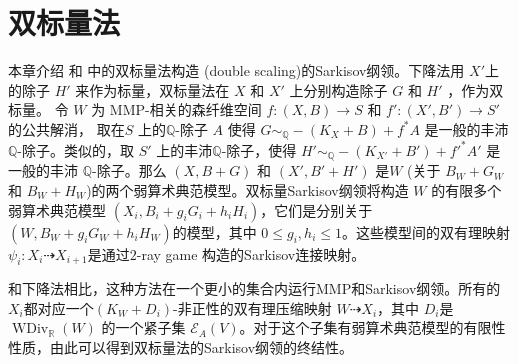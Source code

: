 \chapter{双标量法}
 本章介绍\cite[\S 13]{haconMinimalModelProgram2012} 和  \cite{liuSarkisovProgramGeneralized2021}中的双标量法构造 (double scaling)的Sarkisov纲领。下降法用 $X'$上的除子 $H'$ 来作为标量，双标量法在  $X$ 和 $X'$ 上分别构造除子 $G$ 和 $H'$ ，作为双标量。
令 $W$ 为 MMP-相关的森纤维空间 $f:(X,B)\to S$ 和 $f':(X',B')\to S'$  的公共解消，  取在$ S $ 上的$\mathbb{Q}$-除子 $A$ 使得 $G \sim_{\mathbb{Q}} -(K_{X}+B) +f^*A$ 是一般的丰沛 $\mathbb{Q}$-除子。类似的，取 $S'$ 上的丰沛$\mathbb{Q}$-除子，使得 $H' \sim_{\mathbb{Q}} -(K_{X'}+B') +f'^*A'$ 是一般的丰沛 $\mathbb{Q}$-除子。那么  $(X,B+G)$ 和 $(X',B'+H')$  是$W$ (关于 $B_{W}+G_{W}$ 和 $B_{W}+H_{W}$)的两个弱算术典范模型。双标量Sarkisov纲领将构造 $W$ 的有限多个弱算术典范模型 $(X_{i},B_{i}+g_{i}G_{i}+h_{i}H_{i})$，它们是分别关于 $(W,B_{W}+g_{i}G_{W}+h_{i}H_{W})$的模型，其中 $0\leqslant g_i,h_i\leqslant 1$。这些模型间的双有理映射 $\psi_{i}:X_{i}\dashrightarrow X_{i+1}$是通过$2$-ray game 构造的Sarkisov连接映射。

和下降法相比，这种方法在一个更小的集合内运行MMP和Sarkisov纲领。所有的 $X_{i}$都对应一个$(K_{W}+D_{i})$-非正性的双有理压缩映射 $W\dashrightarrow X_{i}$，其中 $D_{i}$是 $\operatorname{WDiv}_{\mathbb{R}}(W)$ 的一个紧子集 $\mathcal{E}_{A}(V)$。对于这个子集有弱算术典范模型的有限性性质，由此可以得到双标量法的Sarkisov纲领的终结性。
